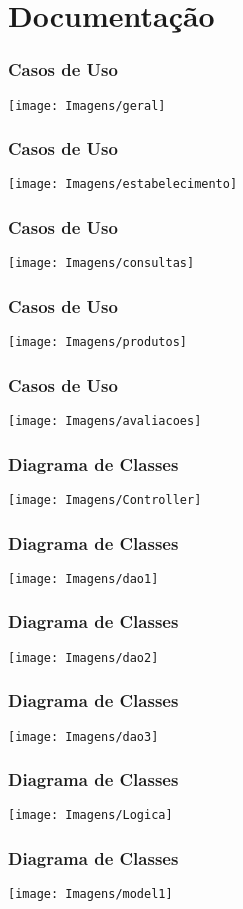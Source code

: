 \section{Documentação}

\begin{frame}
\frametitle{Casos de Uso}
	\texttt{[image: Imagens/geral]}
\end{frame}

\begin{frame}
	\frametitle{Casos de Uso}
	\texttt{[image: Imagens/estabelecimento]}
\end{frame}

\begin{frame}
	\frametitle{Casos de Uso}
	\texttt{[image: Imagens/consultas]}
\end{frame}

\begin{frame}
	\frametitle{Casos de Uso}
	\texttt{[image: Imagens/produtos]}
\end{frame}

\begin{frame}
	\frametitle{Casos de Uso}
	\texttt{[image: Imagens/avaliacoes]}
\end{frame}

\begin{frame}
	\frametitle{Diagrama de Classes}
	\texttt{[image: Imagens/Controller]}
\end{frame}

\begin{frame}
	\frametitle{Diagrama de Classes}
	\texttt{[image: Imagens/dao1]}
\end{frame}

\begin{frame}
	\frametitle{Diagrama de Classes}
	\texttt{[image: Imagens/dao2]}
\end{frame}

\begin{frame}
	\frametitle{Diagrama de Classes}
	\texttt{[image: Imagens/dao3]}
\end{frame}

\begin{frame}
	\frametitle{Diagrama de Classes}
	\texttt{[image: Imagens/Logica]}
\end{frame}

\begin{frame}
	\frametitle{Diagrama de Classes}
	\texttt{[image: Imagens/model1]}
\end{frame}

